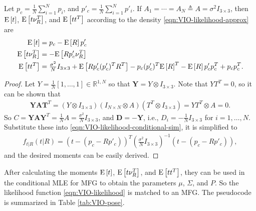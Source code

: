 \begin{theorem} \label{thm:VIO-conditional-sim}
	Let $p_c = \tfrac{1}{N}\sum_{i=1}^N p_i$, and $p'_c = \tfrac{1}{N}\sum_{i=1}^N p'_i$.
	If $A_1 = \cdots = A_N \triangleq A = \sigma^2I_{3\times 3}$, then $\mathrm{E}\left[ t \right]$, $\mathrm{E}\left[ t\nu_R^T \right]$, and $\mathrm{E}\left[ tt^T \right]$ according to the density \eqref{eqn:VIO-likelihood-approx} are
	\begin{align}
		\mathrm{E}\left[ t \right] &= p_c - \mathrm{E}\left[ R \right]p'_c \\
		\mathrm{E}\left[ t\nu_R^T \right] &= -\mathrm{E}\left[ Rp'_c\nu_R^T \right] \\
		\mathrm{E}\left[ tt^T \right] &= \tfrac{\sigma^2}{N}I_{3\times 3} + \mathrm{E}\left[ Rp'_c(p'_c)^TR^T \right] - p_c(p'_c)^T\mathrm{E}\left[ R \right]^T - \mathrm{E}\left[ R \right]p'_cp_c^T + p_cp_c^T.
	\end{align}
\end{theorem}
\begin{proof}
	Let $Y = \tfrac{1}{N}[1,\ldots,1]\in\mathbb{R}^{1,N}$ so that $\mathbf{Y} = Y\otimes I_{3\times 3}$.
	Note that $YT^T = 0$, so it can be shown that
	\begin{align*}
		\mathbf{YAT}^T = (Y\otimes I_{3\times 3})(I_{N\times N}\otimes A) (T^T\otimes I_{3\times 3}) = YT^T\otimes A = 0.
	\end{align*}
	So $C = \mathbf{YAY}^T = \tfrac{1}{N}A = \tfrac{\sigma^2}{N} I_{3\times 3}$, and $\mathbf{D} = -\mathbf{Y}$, i.e., $D_i = -\tfrac{1}{N}I_{3\times 3}$ for $i=1,\ldots,N$.
	Substitute these into \eqref{eqn:VIO-likelihood-conditional-sim}, it is simplified to
	\begin{align}
		f_{t|R}(t|R) = \left( t - (p_c-Rp'_c) \right)^T \left( \tfrac{\sigma^2}{N}I_{3\times 3} \right)^{-1} \left( t - (p_c-Rp'_c) \right),
	\end{align}
	and the desired moments can be easily derived.
\end{proof}

After calculating the moments $\mathrm{E}\left[ t \right]$, $\mathrm{E}\left[ t\nu_R^T \right]$, and $\mathrm{E}\left[ tt^T \right]$, they can be used in the conditional MLE for MFG to obtain the parameters $\mu$, $\Sigma$, and $P$.
So the likelihood function \eqref{eqn:VIO-likelihood} is matched to an MFG.
The pseudocode is summarized in Table \ref{tab:VIO-pose}.

